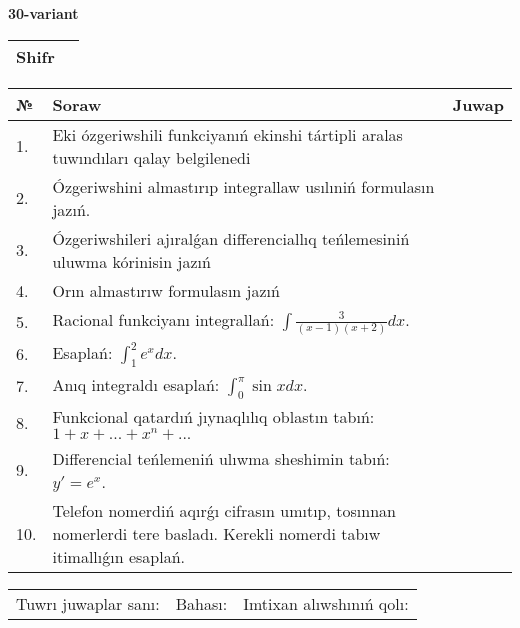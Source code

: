 \documentclass{article}
\begin{document}
  \egroup
  
  \newpage
  
  
  \textbf{30-variant}\\
  
  \bgroup
  \def\arraystretch{1.6} %
  
  \begin{tabular}{|m{5.7cm}|m{9.5cm}|}
  \hline
  Shifr & \\
  \hline
  \end{tabular}
  
  \vspace{1cm}
  
  \begin{tabular}{|m{0.7cm}|m{10cm}|m{4cm}|}
  \hline
  № & Soraw & Juwap \\
  \hline
  1. & Eki ózgeriwshili funkciyanıń ekinshi tártipli aralas tuwındıları qalay belgilenedi &  \\
  \hline
  2. & Ózgeriwshini almastırıp integrallaw usılıniń formulasın jazıń. &  \\
  \hline
  3. & Ózgeriwshileri ajıralǵan differenciallıq teńlemesiniń uluwma kórinisin jazıń &  \\
  \hline
  4. & Orın almastırıw formulasın jazıń &  \\
  \hline
  5. & Racional funkciyanı integrallań: \(\int{\frac{3}{(x - 1)(x + 2)}dx}\). &  \\
  \hline
  6. & Esaplań: \(\int_{1}^2 {e^{x}dx}\). &  \\
  \hline
  7. & Anıq integraldı esaplań: \(\int_{0}^{\pi}{\sin xdx}\). &  \\
  \hline
  8. & Funkcional qatardıń jıynaqlılıq oblastın tabıń:\(1 + x + ... + x^{n} + ...\) &  \\
  \hline
  9. & Differencial teńlemeniń ulıwma sheshimin tabıń: \(y' = e^{x}\). &  \\
  \hline
  10. & Telefon nomerdiń aqırǵı cifrasın umıtıp, tosınnan nomerlerdi tere basladı. Kerekli nomerdi tabıw itimallıǵın esaplań. &  \\
  \hline
  \end{tabular}
  
  \vspace{1cm}
  
  \begin{tabular}{lll}
  Tuwrı juwaplar sanı: \underline{\hspace{1.5cm}} & 
  Bahası: \underline{\hspace{1.5cm}} & 
  Imtixan alıwshınıń qolı: \underline{\hspace{2cm}} \\
  \end{tabular}
  
\end{document}
